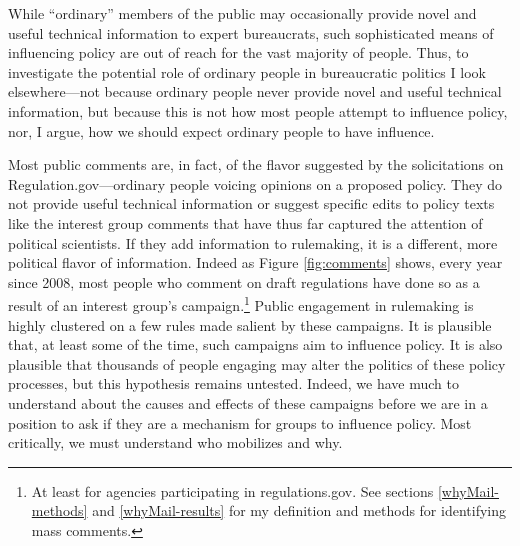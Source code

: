 %  

While ``ordinary'' members of the public may occasionally provide novel and useful technical information to expert bureaucrats, such sophisticated means of influencing policy are out of reach for the vast majority of people. Thus, to investigate the potential role of ordinary people in bureaucratic politics I look elsewhere---not because ordinary people never provide novel and useful technical information, but because this is not how most people attempt to influence policy, nor, I argue, how we should expect ordinary people to have influence.

Most public comments are, in fact, of the flavor suggested by the solicitations on Regulation.gov---ordinary people voicing opinions on a proposed policy. They do not provide useful technical information or suggest specific edits to policy texts like the interest group comments that have thus far captured the attention of political scientists. If they add information to rulemaking, it is a different, more political flavor of information.  Indeed as Figure \ref{fig:comments} shows, every year since 2008, most people who comment on draft regulations have done so as a result of an interest group's campaign.\footnote{At least for agencies participating in regulations.gov. See sections \ref{whyMail-methods} and \ref{whyMail-results} for my definition and methods for identifying mass comments.} 
Public engagement in rulemaking is highly clustered on a few rules made salient by these campaigns. It is plausible that, at least some of the time, such campaigns aim to influence policy. It is also plausible that thousands of people engaging may alter the politics of these policy processes, but this hypothesis remains untested. Indeed, we have much to understand about the causes and effects of these campaigns before we are in a position to ask if they are a mechanism for %
groups to influence policy. Most critically, we must understand who mobilizes and why.

